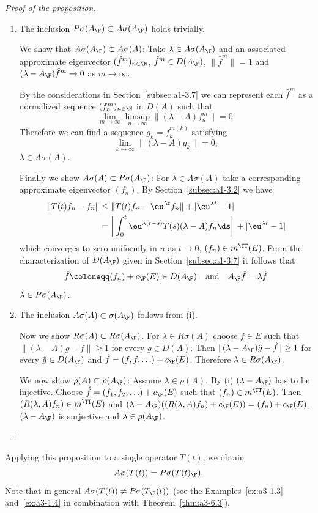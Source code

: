 \begin{proof}[Proof of the proposition]
\begin{enumerate}[\upshape (i), wide, labelindent=.25em]
\item 
The inclusion $P\sigma(A_{\F}) \subset A\sigma(A_{\F})$ holds trivially.

We show that $A\sigma(A_{\F}) \subset A\sigma(A)$: Take $\lambda \in A\sigma(A_{\F})$ and an associated approximate eigenvector $({\hat{f}^{m}})_{n \in \N}$, \ie $\hat{f}^{m} \in D(A_{\F})$, $\|\hat{f}^{m}\| = 1$ and $(\lambda-A_{\F})\hat{f}^{m} \to 0$ as $m \to \infty$.

By the considerations in Section~\ref{subsec:a1-3.7} we can represent each $\hat{f}^{m}$ as a normalized sequence $(f_{n}^{m})_{n \in \N}$ in $D(A)$ such that
\[
\lim_{m \to \infty} \limsup_{n \to \infty} \|(\lambda-A)f_{n}^{m}\| = 0 .
\]
Therefore we can find a sequence $g_{k} = f_{k}^{m(k)}$ satisfying
\[
\lim_{k \to \infty} \|(\lambda-A)g_{k}\| = 0 ,
\]
\ie $\lambda \in A\sigma(A)$.

Finally we show $A\sigma(A) \subset P\sigma(A_{\F})$: For $\lambda \in A\sigma(A)$ take a corresponding approximate eigenvector $(f_{n})$.
By Section~\ref{subsec:a1-3.2} we have
\begin{align*}
\|T(t)f_{n} - f_{n}\| &\leq \|T(t)f_{n} - \eu^{\lambda t}f_{n}\| + |\eu^{\lambda t} - 1| \\
&= \left\|\int_{0}^{t} \eu^{\lambda(t-s)}T(s)(\lambda-A)f_{n} \ds\right\| + |\eu^{\lambda t} - 1|
\end{align*}
which converges to zero uniformly in $n$ as $t \to 0$, \ie $(f_{n}) \in m^{\TT}(E)$.
From the characterization of\/ $D(A_{\F})$ given in Section~\ref{subsec:a1-3.7} it follows that
\[
	\hat{f} \coloneqq (f_{n}) + c_{\F}(E) \in D(A_{\F})
	\quad \text{and} \quad
	A_{\F}\hat{f} = \lambda\hat{f}
\]
\ie  $\lambda \in P\sigma(A_{\F}) $.

\item 
The inclusion $A\sigma(A) \subset \sigma(A_{\F})$ follows from (i). 

Now we show $R\sigma(A) \subset R\sigma(A_{\F})$.
For $\lambda \in R\sigma(A)$ choose $f \in E$ such that $\|(\lambda-A)g - f\| \geq 1$ for every $g \in D(A)$.
Then $\|(\lambda-A_{\F})\hat{g} - \hat{f}\| \geq 1$ for every $\hat{g} \in D(A_{\F})$ and $\hat{f} = (f,f,\ldots) + c_{\F}(E)$.
Therefore $\lambda \in R\sigma(A_{\F})$.

We now show $\rho(A) \subset \rho(A_{\F})$: Assume $\lambda \in \rho(A)$.
By (i) $(\lambda-A_{\F})$ has to be injective.
Choose $\hat{f} = (f_{1},f_{2},\ldots) + c_{\F}(E)$ such that $(f_{n}) \in m^{\TT}(E)$.
Then $(R(\lambda,A)f_{n}) \in m^{\TT}(E)$ and $(\lambda-A_{\F})((R(\lambda,A)f_{n})+c_{\F}(E)) = (f_{n}) + c_{\F}(E)$, \ie $(\lambda-A_{\F})$ is surjective and $\lambda \in \rho(A_{\F})$.
\qedhere
\end{enumerate}
\end{proof}
Applying this proposition to a single operator $T(t)$, we obtain
\[
A\sigma(T(t)) = P\sigma(T(t)_{\F}) .
\]
Note that in general $A\sigma(T(t)) \neq P\sigma(T_{\F}(t))$ (see the Examples~\ref{ex:a3-1.3} and~\ref{ex:a3-1.4} in combination with Theorem~\ref{thm:a3-6.3}).
